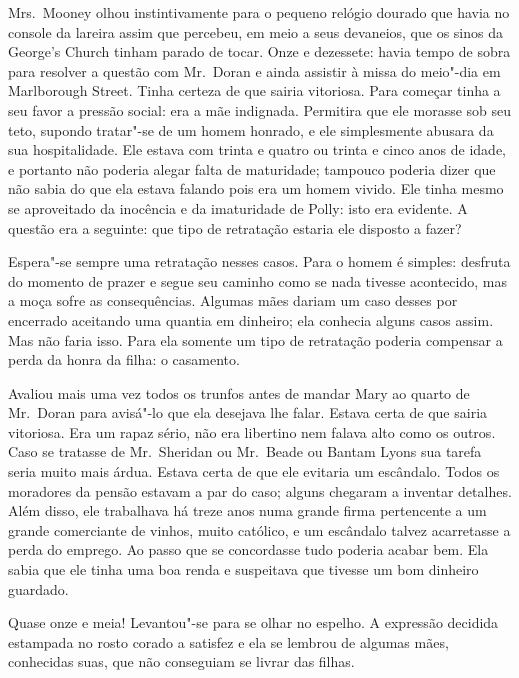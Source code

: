 Mrs.~Mooney olhou instintivamente para o pequeno relógio dourado que havia no
console da lareira assim que percebeu, em meio a seus devaneios, que os sinos
da George’s Church tinham parado de tocar.  Onze e dezessete: havia tempo de
sobra para resolver a questão com Mr.~Doran e ainda assistir à missa do
meio"-dia em Marlborough Street.  Tinha certeza de que sairia vitoriosa.  Para
começar tinha a seu favor a pressão social: era a mãe indignada.  Permitira que
ele morasse sob seu teto, supondo tratar"-se de um homem honrado, e ele
simplesmente abusara da sua hospitalidade.  Ele estava com trinta e quatro ou
trinta e cinco anos de idade, e portanto não poderia alegar falta de
maturidade; tampouco poderia dizer que não sabia do que ela estava falando pois
era um homem vivido.  Ele tinha mesmo se aproveitado da inocência e da
imaturidade de Polly: isto era evidente.  A questão era a seguinte: que tipo de
retratação estaria ele disposto a fazer?

Espera"-se sempre uma retratação nesses casos.  Para o homem é simples: desfruta
do momento de prazer e segue seu caminho como se nada tivesse acontecido, mas a
moça sofre as consequências.  Algumas mães dariam um caso desses por encerrado
aceitando uma quantia em dinheiro; ela conhecia alguns casos assim.  Mas não
faria isso.  Para ela somente um tipo de retratação poderia compensar a perda
da honra da filha: o casamento.

Avaliou mais uma vez todos os trunfos antes de mandar Mary ao quarto de Mr.~Doran 
para avisá"-lo que ela desejava lhe falar.  Estava certa de que sairia
vitoriosa.  Era um rapaz sério, não era libertino nem falava alto como os
outros.  Caso se tratasse de Mr.~Sheridan ou Mr.~Beade ou Bantam Lyons sua
tarefa seria muito mais árdua.  Estava certa de que ele evitaria um escândalo.
Todos os moradores da pensão estavam a par do caso; alguns chegaram a inventar
detalhes.  Além disso, ele trabalhava há treze anos numa grande firma
pertencente a um grande comerciante de vinhos, muito católico, e um escândalo
talvez acarretasse a perda do emprego.  Ao passo que se concordasse tudo
poderia acabar bem.  Ela sabia que ele tinha uma boa renda e suspeitava que
tivesse um bom dinheiro guardado.

Quase onze e meia!  Levantou"-se para se olhar no espelho.  A expressão decidida
estampada no rosto corado a satisfez e ela se lembrou de algumas mães,
conhecidas suas, que não conseguiam se livrar das filhas.

